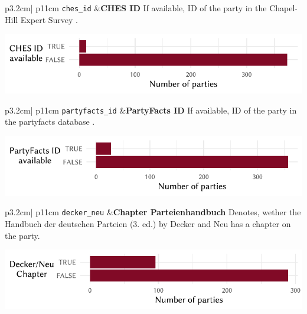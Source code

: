\documentclass[
]{scrartcl}
\begin{document}
\begin{longtable}{p{3.2cm}| p{11cm}}
\texttt{ches\_id} &\textbf{CHES ID}\newline 
If available, ID of the party in the Chapel-Hill Expert Survey \parencite{jollyChapelHillExpert2022}.


\hspace*{.25cm}
\begin{minipage}[t]{\linewidth }
\vspace{0pt}
\includegraphics[width = \linewidth]{cbfiles/chesplot.pdf}
\end{minipage}



\end{longtable}

\begin{longtable}{p{3.2cm}| p{11cm}}
\texttt{partyfacts\_id} &\textbf{PartyFacts ID}\newline 
If available, ID of the party in the partyfacts database \parencite{doringPartyFactsDatabase2019}.

\hspace*{.25cm}
\begin{minipage}[t]{\linewidth }
\vspace{0pt}
\includegraphics[width = \linewidth]{cbfiles/partyfactsplot.pdf}
\end{minipage}



\end{longtable}

\begin{longtable}{p{3.2cm}| p{11cm}}
\texttt{decker\_neu} &\textbf{Chapter Parteienhandbuch}\newline 
Denotes, wether the Handbuch der deutschen Parteien (3. ed.) by Decker and Neu \parencite{deckerHandbuchDeutschenParteien2018b} has a chapter on the party.

\hspace*{.25cm}
\begin{minipage}[t]{\linewidth }
\vspace{0pt}
\includegraphics[width = \linewidth]{cbfiles/deckerneuplot.pdf}
\end{minipage}



\end{longtable}
\end{document}
